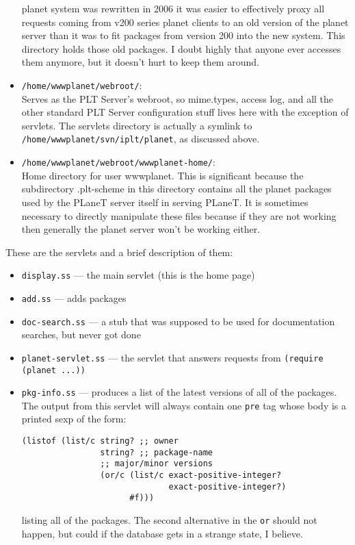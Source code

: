 \documentclass{article}
\begin{document}
\begin{itemize}
  planet system was rewritten in 2006 it was easier to effectively
  proxy all requests coming from v200 series planet clients to an old
  version of the planet server than it was to fit packages from
  version 200 into the new system. This directory holds those old
  packages. I doubt highly that anyone ever accesses them anymore, but
  it doesn't hurt to keep them around.
\item \texttt{/home/wwwplanet/webroot/}: \\
Serves as the PLT Server's webroot, so mime.types, access log, and all
  the other standard PLT Server configuration stuff lives here with
  the exception of servlets. The servlets directory is actually a
  symlink to \texttt{/home/wwwplanet/svn/iplt/planet}, as discussed above.
\item \texttt{/home/wwwplanet/webroot/wwwplanet-home/}: \\
Home directory for user wwwplanet. This is significant because the
  subdirectory .plt-scheme in this directory contains all the planet
  packages used by the PLaneT server itself in serving PLaneT. It is
  sometimes necessary to directly manipulate these files because if
  they are not working then generally the planet server won't be
  working either.
\end{itemize}

These are the servlets and a brief description of them:
\begin{itemize}
\item \texttt{display.ss} --- the main servlet (this is the home page)
\item \texttt{add.ss} --- adds packages
\item \texttt{doc-search.ss} --- a stub that was supposed to be used for documentation searches, but never got done
\item \texttt{planet-servlet.ss} --- the servlet that answers requests from \texttt{(require (planet ...))}

\item \texttt{pkg-info.ss} --- produces a list of the latest versions
  of all of the packages. The output from this servlet will always
  contain one \texttt{pre} tag whose body is a printed sexp of the
  form:
\begin{verbatim}
(listof (list/c string? ;; owner
                string? ;; package-name
                ;; major/minor versions
                (or/c (list/c exact-positive-integer? 
                              exact-positive-integer?)
                      #f)))
\end{verbatim}
listing all of the packages. The second alternative in the \texttt{or} should
not happen, but could if the database gets in a strange state, I believe.
\end{itemize}
\end{document}
